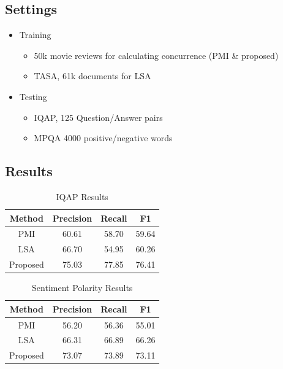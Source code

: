 \documentclass[compress]{beamer}
\begin{document}
\subsection{Settings}
\begin{frame}{\subsecname}
\begin{itemize}
\item Training
\begin{itemize}
\item 50k movie reviews for calculating concurrence (PMI \& proposed)
\item TASA, 61k documents for LSA
\end{itemize}
\item Testing
\begin{itemize}
\item IQAP, 125 Question/Answer pairs
\item MPQA 4000 positive/negative words
\end{itemize}
\end{itemize}
\end{frame}

\subsection{Results}
\begin{frame}{\subsecname}
\begin{table}[]
\centering
\begin{tabular}{|c|c|c|c|}
\hline

Method   & Precision & Recall & F1    \\ \hline
PMI      & 60.61     & 58.70  & 59.64 \\ \hline
LSA      & 66.70     & 54.95  & 60.26 \\ \hline
Proposed & 75.03     & 77.85  & 76.41 \\ \hline
\end{tabular}
\caption{IQAP Results}
\end{table}
    
\begin{table}[]
\centering
\begin{tabular}{|c|c|c|c|}
\hline

Method   & Precision & Recall & F1    \\ \hline
PMI      & 56.20     & 56.36  & 55.01 \\ \hline
LSA      & 66.31     & 66.89  & 66.26 \\ \hline
Proposed & 73.07     & 73.89  & 73.11 \\ \hline
\end{tabular}
\caption{Sentiment Polarity Results}
\end{table}
\end{frame}
\end{document}
